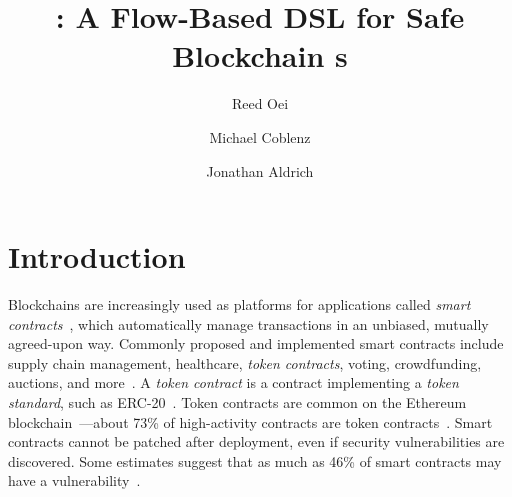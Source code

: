 \documentclass[dvipsnames,runningheads]{llncs}
\begin{document}
\title{\langName: A Flow-Based DSL for Safe Blockchain \AssetTxt{}s}

\author{Reed Oei \and Michael Coblenz \and Jonathan Aldrich}

\maketitle
%

\section{Introduction}
Blockchains are increasingly used as platforms for applications called \emph{smart contracts}~\cite{Szabo97:Formalizing}, which automatically manage transactions in an unbiased, mutually agreed-upon way.
Commonly proposed and implemented smart contracts include supply chain management, healthcare, \emph{token contracts}, voting, crowdfunding, auctions, and more~\cite{SupplyChainUse,HealthcareUse,Elsden18:Making}.
A \emph{token contract} is a contract implementing a \emph{token standard}, such as ERC-20~\cite{erc20}.
Token contracts are common on the Ethereum blockchain~\cite{wood2014ethereum}---about 73\% of high-activity contracts are token contracts~\cite{OlivaEtAl2019}.
Smart contracts cannot be patched after deployment, even if security vulnerabilities are discovered.
Some estimates suggest that as much as 46\% of smart contracts may have a vulnerability~\cite{luuOyente}.
\end{document}
